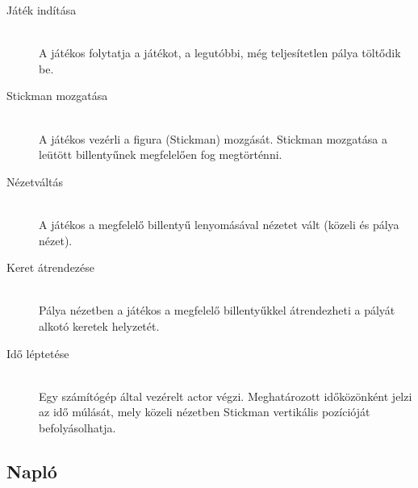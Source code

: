 		\begin{description}
		
		\item[Játék indítása] \hfill \\
			A játékos folytatja a játékot, a legutóbbi, még teljesítetlen pálya töltődik be.
		\item[Stickman mozgatása]\hfill \\
			A játékos vezérli a figura (Stickman) mozgását. Stickman mozgatása a leütött billentyűnek megfelelően fog megtörténni.
		\item[Nézetváltás]\hfill \\
			A játékos a megfelelő billentyű lenyomásával nézetet vált (közeli és pálya nézet).
		\item[Keret átrendezése]\hfill \\
			Pálya nézetben a játékos a megfelelő billentyűkkel átrendezheti a pályát alkotó keretek helyzetét.
		\item[Idő léptetése]\hfill \\
			Egy számítógép által vezérelt actor végzi. Meghatározott időközönként jelzi az idő múlását, mely közeli nézetben Stickman vertikális pozícióját befolyásolhatja.
		\end{description}

\subsection{Napló}

